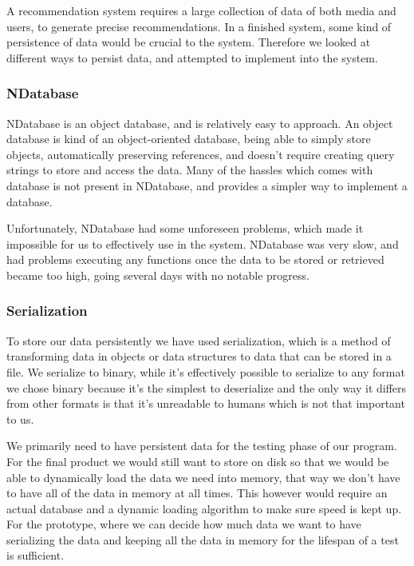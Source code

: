 A recommendation system requires a large collection of data of both media and users, to generate precise recommendations. In a finished system, some kind of persistence of data would be crucial to the system. Therefore we looked at different ways to persist data, and attempted to implement into the system.

\subsubsection{NDatabase}

NDatabase is an object database, and is relatively easy to approach. An object database is kind of an object-oriented database, being able to simply store objects, automatically preserving references, and doesn’t require creating query strings to store and access the data. Many of the hassles which comes with database is not present in NDatabase, and provides a simpler way to implement a database. \cite{NDatabase}

Unfortunately, NDatabase had some unforeseen problems, which made it impossible for us to effectively use in the system. NDatabase was very slow, and had problems executing any functions once the data to be stored or retrieved became too high, going several days with no notable progress.

\subsubsection{Serialization}

To store our data persistently we have used serialization, which is a method of transforming data in objects or data structures to data that can be stored in a file\cite{Serialization}. We serialize to binary, while it’s effectively possible to serialize to any format we chose binary because it’s the simplest to deserialize and the only way it differs from other formats is that it’s unreadable to humans which is not that important to us. 

We primarily need to have persistent data for the testing phase of our program. For the final product we would still want to store on disk so that we would be able to dynamically load the data we need into memory, that way we don’t have to have all of the data in memory at all times. This however would require an actual database and a dynamic loading algorithm to make sure speed is kept up. For the prototype, where we can decide how much data we want to have serializing the data and keeping all the data in memory for the lifespan of a test is sufficient.